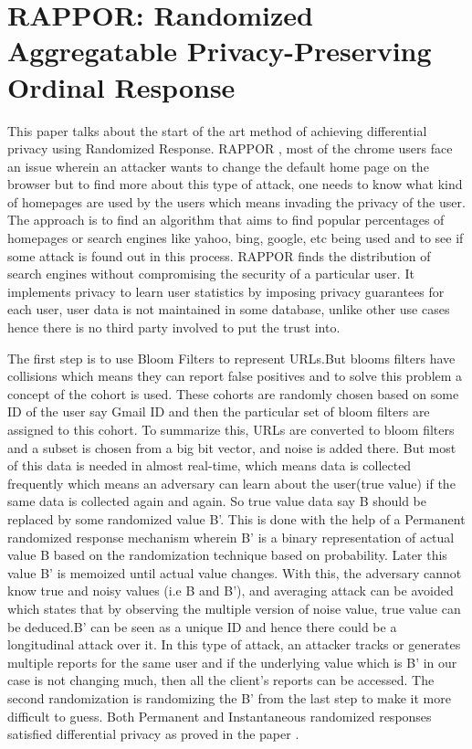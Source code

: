 \section{RAPPOR: Randomized Aggregatable Privacy-Preserving Ordinal Response}
This paper talks about the start of the art method of achieving differential privacy using Randomized Response. RAPPOR \cite{5}, most of the chrome users face an issue wherein an attacker wants to change the default home page on the browser but to find more about this type of attack, one needs to know what kind of homepages are used by the users which means invading the privacy of the user. The approach is to find an algorithm that aims to find popular percentages of homepages or search engines like yahoo, bing, google, etc being used and to see if some attack is found out in this process. RAPPOR finds the distribution of search engines without compromising the security of a particular user. It implements privacy to learn user statistics by imposing privacy guarantees for each user, user data is not maintained in some database, unlike other use cases hence there is no third party involved to put the trust into. 

The first step is to use Bloom Filters to represent URLs.But blooms filters have collisions which means they can report false positives and to solve this problem a concept of the cohort is used. These cohorts are randomly chosen based on some ID of the user say Gmail ID and then the particular set of bloom filters are assigned to this cohort. To summarize this, URLs are converted to bloom filters and a subset is chosen from a big bit vector, and noise is added there. But most of this data is needed in almost real-time, which means data is collected frequently which means an adversary can learn about the user(true value) if the same data is collected again and again. So true value data say B should be replaced by some randomized value B'. This is done with the help of a Permanent randomized response mechanism wherein B' is a binary representation of actual value B based on the randomization technique based on probability. Later this value B' is memoized until actual value changes. With this, the adversary cannot know true and noisy values (i.e B and B'), and averaging attack can be avoided which states that by observing the multiple version of noise value, true value can be deduced.B' can be seen as a unique ID and hence there could be a longitudinal attack over it. In this type of attack, an attacker tracks or generates multiple reports for the same user and if the underlying value which is B' in our case is not changing much, then all the client's reports can be accessed. The second randomization is randomizing the B' from the last step to make it more difficult to guess. Both Permanent and Instantaneous randomized responses satisfied differential privacy as proved in the paper \cite{5}.

